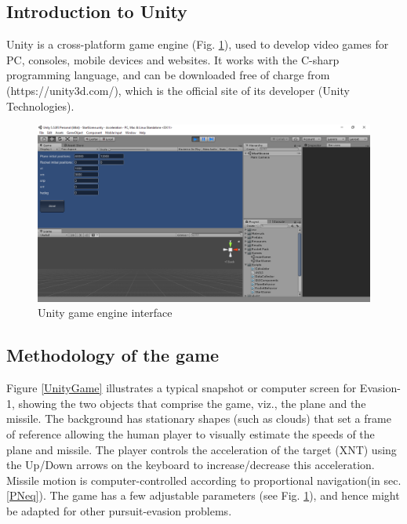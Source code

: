 \subsection{Introduction to Unity}

Unity is a cross-platform game engine (Fig. \ref{UnityInterface}), used to develop video games for PC, consoles, mobile devices and websites. It works with the C-sharp programming language, and can be downloaded free of charge from (https://unity3d.com/), which is the official site of its developer (Unity Technologies).


\begin{figure}[H]
	\centering
	\includegraphics[scale = 0.30]{fig/unityInterface.PNG}
	\caption{Unity game engine interface }
	\label{UnityInterface}
\end{figure}


\subsection{Methodology of the game}

Figure \ref{UnityGame} illustrates a typical snapshot or computer screen for Evasion-1, showing the two objects that comprise the game, viz., the plane and the missile. The background has stationary shapes (such as clouds) that set a frame of reference allowing the human player to visually estimate the speeds of the plane and missile. The player controls the acceleration of the target (XNT) using the Up/Down arrows on the keyboard to increase/decrease this acceleration.   Missile motion is computer-controlled according to proportional navigation(in sec. \ref{PNeq}). The game has a few adjustable parameters (see Fig. \ref{UnityInterface}), and hence might be adapted for other pursuit-evasion problems.


